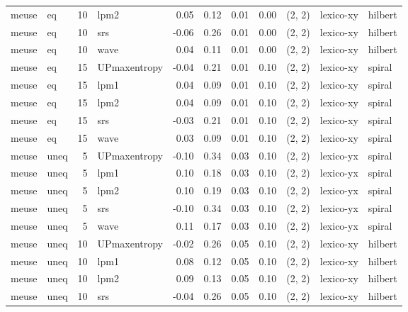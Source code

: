 \begin{tabular}{llrlrrrrlll}
 meuse &    eq & 10 &         lpm2 &  0.05 &     0.12 &   0.01 &       0.00 & (2, 2) &   lexico-xy &    hilbert \\
 meuse &    eq & 10 &          srs & -0.06 &     0.26 &   0.01 &       0.00 & (2, 2) &   lexico-xy &    hilbert \\
 meuse &    eq & 10 &         wave &  0.04 &     0.11 &   0.01 &       0.00 & (2, 2) &   lexico-xy &    hilbert \\
 meuse &    eq & 15 & UPmaxentropy & -0.04 &     0.21 &   0.01 &       0.10 & (2, 2) &   lexico-xy &     spiral \\
 meuse &    eq & 15 &         lpm1 &  0.04 &     0.09 &   0.01 &       0.10 & (2, 2) &   lexico-xy &     spiral \\
 meuse &    eq & 15 &         lpm2 &  0.04 &     0.09 &   0.01 &       0.10 & (2, 2) &   lexico-xy &     spiral \\
 meuse &    eq & 15 &          srs & -0.03 &     0.21 &   0.01 &       0.10 & (2, 2) &   lexico-xy &     spiral \\
 meuse &    eq & 15 &         wave &  0.03 &     0.09 &   0.01 &       0.10 & (2, 2) &   lexico-xy &     spiral \\
 meuse &  uneq &  5 & UPmaxentropy & -0.10 &     0.34 &   0.03 &       0.10 & (2, 2) &   lexico-yx &     spiral \\
 meuse &  uneq &  5 &         lpm1 &  0.10 &     0.18 &   0.03 &       0.10 & (2, 2) &   lexico-yx &     spiral \\
 meuse &  uneq &  5 &         lpm2 &  0.10 &     0.19 &   0.03 &       0.10 & (2, 2) &   lexico-yx &     spiral \\
 meuse &  uneq &  5 &          srs & -0.10 &     0.34 &   0.03 &       0.10 & (2, 2) &   lexico-yx &     spiral \\
 meuse &  uneq &  5 &         wave &  0.11 &     0.17 &   0.03 &       0.10 & (2, 2) &   lexico-yx &     spiral \\
 meuse &  uneq & 10 & UPmaxentropy & -0.02 &     0.26 &   0.05 &       0.10 & (2, 2) &   lexico-xy &    hilbert \\
 meuse &  uneq & 10 &         lpm1 &  0.08 &     0.12 &   0.05 &       0.10 & (2, 2) &   lexico-xy &    hilbert \\
 meuse &  uneq & 10 &         lpm2 &  0.09 &     0.13 &   0.05 &       0.10 & (2, 2) &   lexico-xy &    hilbert \\
 meuse &  uneq & 10 &          srs & -0.04 &     0.26 &   0.05 &       0.10 & (2, 2) &   lexico-xy &    hilbert \\

\end{tabular}

